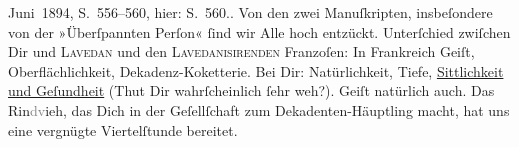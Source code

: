 {{{                        Juni 1894, S. 556–560, hier: S. 560.}}}\label{K_L02621-5}. Von den
               zwei Manuſkripten,
               insbeſondere von der »Überſpannten
                  Perſon« ſind wir Alle hoch entzückt. Unterſchied zwiſchen Dir und \textsc{Lavedan} und den \textsc{Lavedanisirenden}{ }Franzoſen: In Frankreich Geiſt, Oberflächlichkeit, Dekadenz-Koketterie. Bei
               Dir: Na{\pb}türlichkeit, Tiefe, \uline{Sittlichkeit und Geſundheit} (Thut Dir wahrſcheinlich ſehr weh?).  Geiſt natürlich auch. Das Rin\textcolor{gray}{dv}ieh, das Dich in
               der Geſellſchaft zum Dekadenten-Häuptling macht, hat uns eine vergnügte Viertelſtunde
               bereitet.\pend
           
